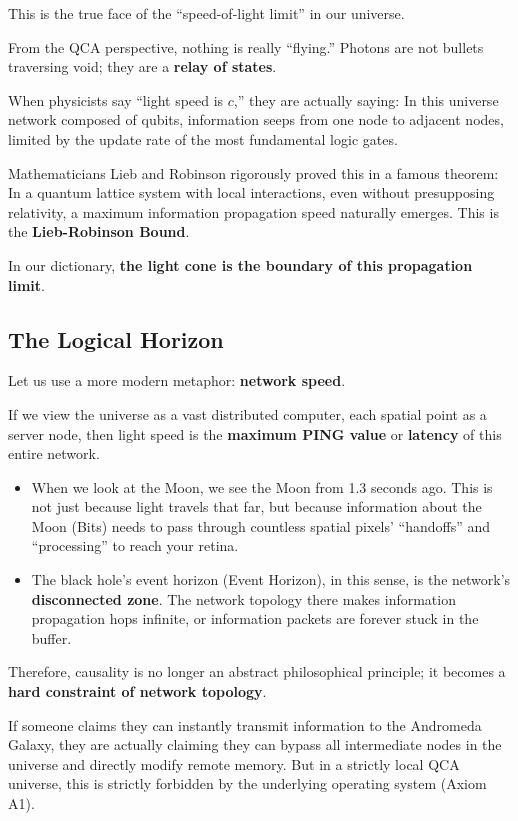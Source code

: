 This is the true face of the ``speed-of-light limit'' in our universe.

From the QCA perspective, nothing is really ``flying.'' Photons are not bullets traversing void; they are a \textbf{relay of states}.

When physicists say ``light speed is $c$,'' they are actually saying: In this universe network composed of qubits, information seeps from one node to adjacent nodes, limited by the update rate of the most fundamental logic gates.

Mathematicians Lieb and Robinson rigorously proved this in a famous theorem: In a quantum lattice system with local interactions, even without presupposing relativity, a maximum information propagation speed naturally emerges. This is the \textbf{Lieb-Robinson Bound}.

In our dictionary, \textbf{the light cone is the boundary of this propagation limit}.

\subsection{The Logical Horizon}

Let us use a more modern metaphor: \textbf{network speed}.

If we view the universe as a vast distributed computer, each spatial point as a server node, then light speed is the \textbf{maximum PING value} or \textbf{latency} of this entire network.

\begin{itemize}
\item When we look at the Moon, we see the Moon from 1.3 seconds ago. This is not just because light travels that far, but because information about the Moon (Bits) needs to pass through countless spatial pixels' ``handoffs'' and ``processing'' to reach your retina.

\item The black hole's event horizon (Event Horizon), in this sense, is the network's \textbf{disconnected zone}. The network topology there makes information propagation hops infinite, or information packets are forever stuck in the buffer.
\end{itemize}

Therefore, causality is no longer an abstract philosophical principle; it becomes a \textbf{hard constraint of network topology}.

If someone claims they can instantly transmit information to the Andromeda Galaxy, they are actually claiming they can bypass all intermediate nodes in the universe and directly modify remote memory. But in a strictly local QCA universe, this is strictly forbidden by the underlying operating system (Axiom A1).

